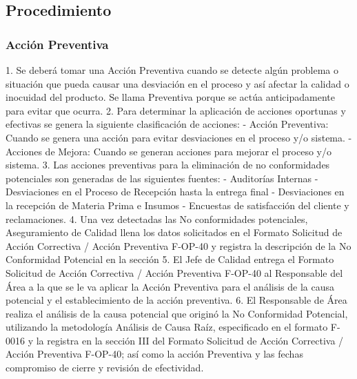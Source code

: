 \subsection{Procedimiento}

\subsubsection{Acción Preventiva}

1. Se deberá tomar una Acción Preventiva cuando se detecte algún problema o situación que pueda causar una desviación en el proceso y así afectar la calidad o inocuidad del producto. Se llama Preventiva porque se actúa anticipadamente para evitar que ocurra.
2. Para determinar la aplicación de acciones oportunas y efectivas se genera la siguiente clasificación de acciones:
- Acción Preventiva: Cuando se genera una acción para evitar desviaciones en el proceso y/o sistema.
- Acciones de Mejora: Cuando se generan acciones para mejorar el proceso y/o sistema.
3. Las acciones preventivas para la eliminación de no conformidades potenciales son generadas de las siguientes fuentes:
- Auditorías Internas
- Desviaciones en el Proceso de Recepción hasta la entrega final
- Desviaciones en la recepción de Materia Prima e Insumos
- Encuestas de satisfacción del cliente y reclamaciones.
4. Una vez detectadas las No conformidades potenciales, Aseguramiento de Calidad llena los datos solicitados en el Formato Solicitud de Acción Correctiva / Acción Preventiva F-OP-40 y registra la descripción de la No Conformidad Potencial en la sección
5. El Jefe de Calidad entrega el Formato Solicitud de Acción Correctiva / Acción Preventiva F-OP-40 al Responsable del Área a la que se le va aplicar la Acción Preventiva para el análisis de la causa potencial y el establecimiento de la acción preventiva.
6. El Responsable de Área realiza el análisis de la causa potencial que originó la No Conformidad Potencial, utilizando la metodología Análisis de Causa Raíz, especificado en el formato F-0016 y la registra en la sección III del Formato Solicitud de Acción Correctiva / Acción Preventiva F-OP-40; así como la acción Preventiva y las fechas compromiso de cierre y revisión de efectividad.

